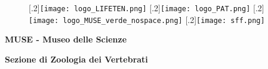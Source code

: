 \documentclass[10pt,twoside,openany,x11names,svgnames,italian,a5paper,dvipsnames,table]{memoir}
\begin{document}
\begin{center}
\vspace*{\fill}

\begin{figure}[htp]
\captionsetup{font=small}
\centering
{}[.2\linewidth]{\texttt{[image: logo\_LIFETEN.png]}}
[.2\linewidth]{\texttt{[image: logo\_PAT.png]}}
[.2\linewidth]{\texttt{[image: logo\_MUSE\_verde\_nospace.png]}}
[.2\linewidth]{\texttt{[image: sff.png]}}
\end{figure}

\textbf{\textcolor{LightGoldenrod!50!Gold}{MUSE - Museo delle Scienze}}

\vspace*{\baselineskip}

\textbf{\textcolor{LightGoldenrod}{Sezione di Zoologia dei Vertebrati}}
\end{center}
\end{document}
